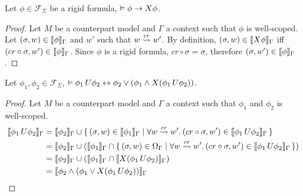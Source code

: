 \begin{lemma}\label{lem:nextintro}
  Let $\phi \in \mathcal{F}_\Sigma$ be a rigid formula, $\vDash \phi \to X{\phi}$.
\end{lemma}
\begin{proof}
  Let $M$ be a counterpart model and $\Gamma$ a context such that $\phi$ is well-scoped.
  Let $(\sigma, w) \in \llbracket \phi \rrbracket_{\Gamma}$ and $w'$ such that $w \overset{cr}{\rightsquigarrow} w'$. By definition, $(\sigma, w) \in
  \llbracket X{\phi} \rrbracket_{\Gamma}$ iff $(cr \circ \sigma, w') \in \llbracket \phi \rrbracket_{\Gamma}$. Since $\phi$ is a rigid formula, $cr
  \circ \sigma = \sigma$, therefore $(\sigma, w') \in \llbracket \phi \rrbracket_{\Gamma}$.
\end{proof}

\begin{lemma}\label{lem:untilexp}
  Let $\phi_1, \phi_2 \in \mathcal{F}_\Sigma$, $\vDash {\phi_1}\,U {\phi_2} \leftrightarrow \phi_2 \lor (\phi_1 \land
  X{({\phi_1}\,U {\phi_2})})$.
\end{lemma}
\begin{proof}
  Let $M$ be a counterpart model and $\Gamma$ a context such that $\phi_1$ and $\phi_2$ is well-scoped.
  \[
    \begin{split}
      \llbracket {\phi_1}\,U {\phi_2} \rrbracket_{\Gamma} &= \llbracket \phi_2 \rrbracket_{\Gamma} \cup \set{(\sigma, w) \in \llbracket \phi_1 \rrbracket_{\Gamma} |
      \forall {w \overset{cr}{\rightsquigarrow} w'} \ldotp {(cr \circ \sigma, w') \in \llbracket {\phi_1}\,U {\phi_2} \rrbracket_{\Gamma}}} \\
      &= \llbracket \phi_2 \rrbracket_{\Gamma} \cup (\llbracket \phi_1 \rrbracket_{\Gamma} \cap \set{(\sigma, w) \in \Omega_{\Gamma} |
      \forall {w \overset{cr}{\rightsquigarrow} w'} \ldotp {(cr \circ \sigma, w') \in \llbracket {\phi_1}\,U {\phi_2} \rrbracket_{\Gamma}}}) \\
      &= \llbracket \phi_2 \rrbracket_{\Gamma} \cup (\llbracket \phi_1 \rrbracket_{\Gamma} \cap \llbracket X({\phi_1}\,U {\phi_2}) \rrbracket_{\Gamma}) \\
      &= \llbracket \phi_2 \land (\phi_1 \lor X{({\phi_1}\,U {\phi_2})}) \rrbracket_{\Gamma}
    \end{split}
  \]
\end{proof}

